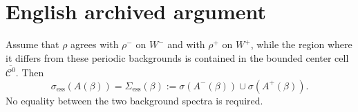 %

\section*{English archived argument}

\begin{proposition}
\label{prop:asymmetric-essential-spectrum}
Assume that $\rho$ agrees with $\rho^-$ on $W^-$ and with $\rho^+$ on $W^+$,
while the region where it differs from these periodic backgrounds is contained
in the bounded center cell $\overline{\mathcal C^0}$.  Then
\begin{equation}
  \boxed{\quad
  \sigma_{\mathrm{ess}}(A(\beta))
  =\Sigma_{\mathrm{ess}}(\beta)
  :=\sigma(A^-(\beta))\cup\sigma(A^+(\beta)).\quad}
  \label{eq:projected-spectrum}
\end{equation}
No equality between the two background spectra is required.
\end{proposition}

